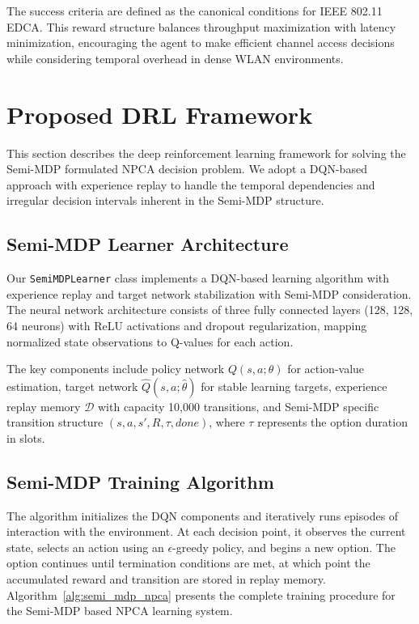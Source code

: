 \documentclass[conference]{IEEEtran}
\begin{document}
The success criteria are defined as the canonical conditions for IEEE 802.11 EDCA. This reward structure balances throughput maximization with latency minimization, encouraging the agent to make efficient channel access decisions while considering temporal overhead in dense WLAN environments.

\section{Proposed DRL Framework}

This section describes the deep reinforcement learning framework for solving the Semi-MDP formulated NPCA decision problem. We adopt a DQN-based approach with experience replay to handle the temporal dependencies and irregular decision intervals inherent in the Semi-MDP structure.

\subsection{Semi-MDP Learner Architecture}

Our \texttt{SemiMDPLearner} class implements a DQN-based learning algorithm with experience replay and target network stabilization with Semi-MDP consideration. The neural network architecture consists of three fully connected layers (128, 128, 64 neurons) with ReLU activations and dropout regularization, mapping normalized state observations to Q-values for each action.

The key components include policy network $Q(s,a;\theta)$ for action-value estimation, target network $\hat{Q}(s,a;\hat{\theta})$ for stable learning targets, experience replay memory $\mathcal{D}$ with capacity 10,000 transitions, and Semi-MDP specific transition structure $(s, a, s', R, \tau, done)$, where $\tau$ represents the option duration in slots.

\subsection{Semi-MDP Training Algorithm}

The algorithm initializes the DQN components and iteratively runs episodes of interaction with the environment. At each decision point, it observes the current state, selects an action using an $\epsilon$-greedy policy, and begins a new option. The option continues until termination conditions are met, at which point the accumulated reward and transition are stored in replay memory. Algorithm~\ref{alg:semi_mdp_npca} presents the complete training procedure for the Semi-MDP based NPCA learning system.
\end{document}
